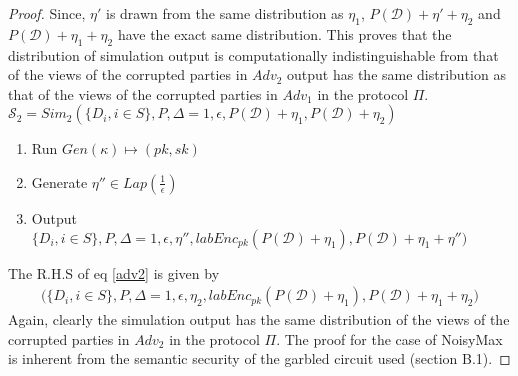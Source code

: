 \begin{proof}
Since, $\eta'$ is drawn from the same distribution as $\eta_1$, $P(\mathcal{D})+\eta'+\eta_2$ and $P(\mathcal{D})+\eta_1+\eta_2$ have the exact same distribution. This proves that the distribution of simulation output is computationally indistinguishable from that of the views of the corrupted parties in $Adv_2$
output has the same distribution as that of the views of the corrupted parties in $Adv_1$ in the
protocol $\Pi$.\\
$\mathcal{S}_2=Sim_2(\{D_i, i \in S\},P,\Delta=1,\epsilon,P(\mathcal{D})+\eta_1,P(\mathcal{D})+\eta_2)$
\begin{enumerate}\item Run $Gen(\kappa)\mapsto (pk,sk)$ \item Generate $\eta'' \in Lap(\frac{1}{\epsilon})$ \item Output $\Big\{D_i, i \in S\},P,\Delta=1,\epsilon, \eta'', labEnc_{pk}(P(\mathcal{D})+\eta_1), P(\mathcal{D})+\eta_1+\eta''\Big)$
\end{enumerate}
The R.H.S of eq \ref{adv2} is given by \begin{gather}\Big(\{D_i, i \in S\},P,\Delta=1,\epsilon,\eta_2,labEnc_{pk}(P(\mathcal{D})+\eta_1),P(\mathcal{D})+\eta_1+\eta_2\Big)\end{gather}
Again, clearly the simulation output has the same distribution of the
views of the corrupted parties in $Adv_2$ in the protocol $\Pi$. 
The proof for the case of NoisyMax is inherent from the semantic security of the garbled circuit used (section B.1).
\end{proof}